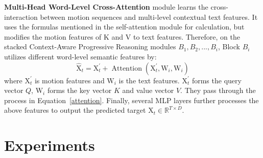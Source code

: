 \documentclass[10pt,twocolumn,letterpaper]{article}
\begin{document}
\textbf{Multi-Head Word-Level Cross-Attention} module learns the cross-interaction between motion sequences and multi-level contextual text features. It uses the formulas mentioned in the self-attention module for calculation, but modifies the motion features of K and V to text features. Therefore, on the stacked Context-Aware Progressive Reasoning modules $B_1, B_2, ..., B_i$, Block $B_i$ utilizes different word-level semantic features by:
\begin{equation}
    \hat{\text{X}}_t = \text{X}_t^{\prime} + \operatorname{Attention}(\text{X}_t^{\prime}  , \text{W}_i, \text{W}_i )
\end{equation}
where $\text{X}_t^{\prime}$ is motion features and $\text{W}_i$ is the text features. $\text{X}_t^{\prime}$ forms the query vector $Q$, $\text{W}_i$ forms the key vector $K$ and value vector $V$. They pass through the process in Equation~\ref{attention}. Finally, several MLP layers further processes the above features to output the predicted target $\text{X}_t \in \mathbb{R}^{T \times D}$.






\section{Experiments}
\end{document}
